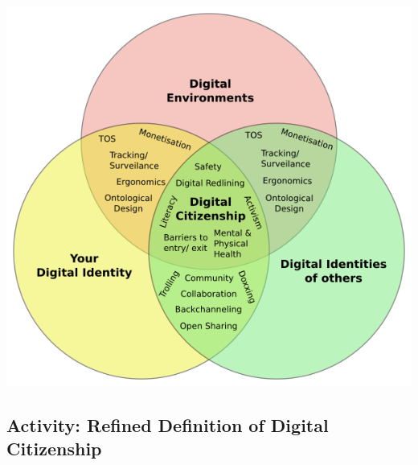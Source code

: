 \documentclass[
]{book}
\theoremstyle{definition}
\theoremstyle{definition}
\theoremstyle{definition}
\theoremstyle{definition}
\theoremstyle{remark}
\begin{document}
\includegraphics{assets/u5/Digital_citizenship_Venn.png}

\hypertarget{activity-refined-definition-of-digital-citizenship}{%
\subsection*{Activity: Refined Definition of Digital Citizenship}\label{activity-refined-definition-of-digital-citizenship}}
\end{document}
